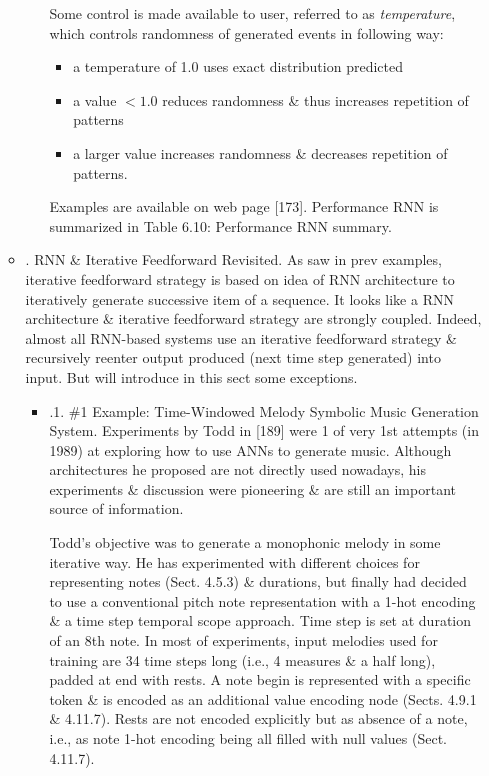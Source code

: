 \documentclass{article}
\begin{document}
\begin{itemize}
\begin{itemize}
\begin{itemize}
			Some control is made available to user, referred to as {\it temperature}, which controls randomness of generated events in following way:
			\begin{itemize}
				\item a temperature of 1.0 uses exact distribution predicted
				\item a value $< 1.0$ reduces randomness \& thus increases repetition of patterns
				\item a larger value increases randomness \& decreases repetition of patterns.
			\end{itemize}
			Examples are available on web page [173]. Performance RNN is summarized in {\sf Table 6.10: Performance RNN summary}.
		\end{itemize}
		\item {. RNN \& Iterative Feedforward Revisited.} As saw in prev examples, iterative feedforward strategy is based on idea of RNN architecture to iteratively generate successive item of a sequence. It looks like a RNN architecture \& iterative feedforward strategy are strongly coupled. Indeed, almost all RNN-based systems use an iterative feedforward strategy \& recursively reenter output produced (next time step generated) into input. But will introduce in this sect some exceptions.
		\begin{itemize}
			\item {.1. \#1 Example: Time-Windowed Melody Symbolic Music Generation System.} Experiments by {\sc Todd} in [189] were 1 of very 1st attempts (in 1989) at exploring how to use ANNs to generate music. Although architectures he proposed are not directly used nowadays, his experiments \& discussion were pioneering \& are still an important source of information.
			
			{\sf Todd}'s objective was to generate a monophonic melody in some iterative way. He has experimented with different choices for representing notes (Sect. 4.5.3) \& durations, but finally had decided to use a conventional pitch note representation with a 1-hot encoding \& a time step temporal scope approach. Time step is set at duration of an 8th note. In most of experiments, input melodies used for training are 34 time steps long (i.e., 4 measures \& a half long), padded at end with rests. A note begin is represented with a specific token \& is encoded as an additional value encoding node (Sects. 4.9.1 \& 4.11.7). Rests are not encoded explicitly but as absence of a note, i.e., as note 1-hot encoding being all filled with null values (Sect. 4.11.7).
			

\end{itemize}
\end{itemize}
\end{itemize}
\end{document}
